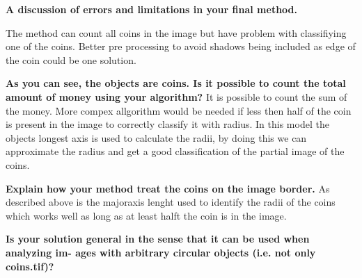\documentclass[a4paper]{article}
\begin{document}
\textbf{A discussion of errors and limitations in your final method.}

The method can count all coins in the image but have problem with classifiying one of the coins. Better pre processing to avoid shadows being included as edge of the coin could be one solution. 

\textbf{As you can see, the objects are coins. Is it possible to count the total amount
of money using your algorithm?}
It is possible to count the sum of the money. More compex allgorithm would be needed if less then half of the coin is present in the image to correctly classify it with radius. In this model the objects longest axis is used to calculate the radii, by doing this we can approximate the radius and get a good classification of the partial image of the coins. 


\textbf{Explain how your method treat the coins on the image border.}
As described above is the majoraxis lenght used to identify the radii of the coins which works well as long as at least halft the coin is in the image. 



\textbf{Is your solution general in the sense that it can be used when analyzing im-
ages with arbitrary circular objects (i.e. not only coins.tif)?}




\end{document}

